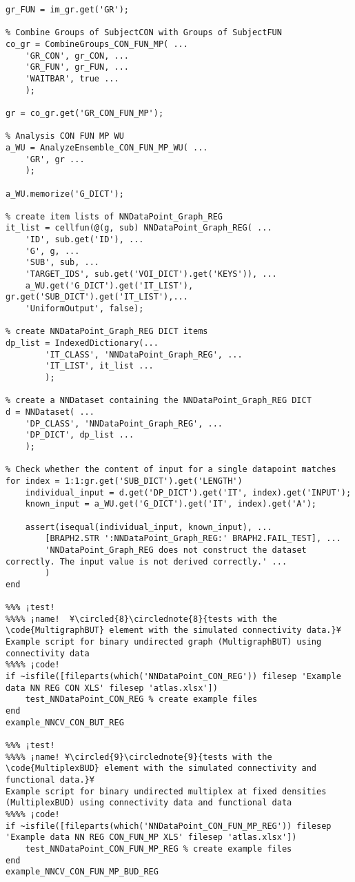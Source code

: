 \documentclass{tufte-handout}
\begin{document}
\begin{lstlisting}
gr_FUN = im_gr.get('GR');

% Combine Groups of SubjectCON with Groups of SubjectFUN
co_gr = CombineGroups_CON_FUN_MP( ...
    'GR_CON', gr_CON, ...
    'GR_FUN', gr_FUN, ...
    'WAITBAR', true ...
    );

gr = co_gr.get('GR_CON_FUN_MP');

% Analysis CON FUN MP WU
a_WU = AnalyzeEnsemble_CON_FUN_MP_WU( ...
    'GR', gr ...
    );

a_WU.memorize('G_DICT');

% create item lists of NNDataPoint_Graph_REG
it_list = cellfun(@(g, sub) NNDataPoint_Graph_REG( ...
    'ID', sub.get('ID'), ...
    'G', g, ...
    'SUB', sub, ...
    'TARGET_IDS', sub.get('VOI_DICT').get('KEYS')), ...
    a_WU.get('G_DICT').get('IT_LIST'), gr.get('SUB_DICT').get('IT_LIST'),...
    'UniformOutput', false);

% create NNDataPoint_Graph_REG DICT items
dp_list = IndexedDictionary(...
        'IT_CLASS', 'NNDataPoint_Graph_REG', ...
        'IT_LIST', it_list ...
        );

% create a NNDataset containing the NNDataPoint_Graph_REG DICT
d = NNDataset( ...
    'DP_CLASS', 'NNDataPoint_Graph_REG', ...
    'DP_DICT', dp_list ...
    );

% Check whether the content of input for a single datapoint matches
for index = 1:1:gr.get('SUB_DICT').get('LENGTH')
    individual_input = d.get('DP_DICT').get('IT', index).get('INPUT');
    known_input = a_WU.get('G_DICT').get('IT', index).get('A');

    assert(isequal(individual_input, known_input), ...
        [BRAPH2.STR ':NNDataPoint_Graph_REG:' BRAPH2.FAIL_TEST], ...
        'NNDataPoint_Graph_REG does not construct the dataset correctly. The input value is not derived correctly.' ...
        )
end

%%% ¡test!
%%%% ¡name!  ¥\circled{8}\circlednote{8}{tests with the \code{MultigraphBUT} element with the simulated connectivity data.}¥
Example script for binary undirected graph (MultigraphBUT) using connectivity data
%%%% ¡code!
if ~isfile([fileparts(which('NNDataPoint_CON_REG')) filesep 'Example data NN REG CON XLS' filesep 'atlas.xlsx'])
    test_NNDataPoint_CON_REG % create example files
end
example_NNCV_CON_BUT_REG

%%% ¡test!
%%%% ¡name! ¥\circled{9}\circlednote{9}{tests with the \code{MultiplexBUD} element with the simulated connectivity and functional data.}¥
Example script for binary undirected multiplex at fixed densities (MultiplexBUD) using connectivity data and functional data
%%%% ¡code!
if ~isfile([fileparts(which('NNDataPoint_CON_FUN_MP_REG')) filesep 'Example data NN REG CON_FUN_MP XLS' filesep 'atlas.xlsx'])
    test_NNDataPoint_CON_FUN_MP_REG % create example files
end
example_NNCV_CON_FUN_MP_BUD_REG


\end{lstlisting}
\end{document}
